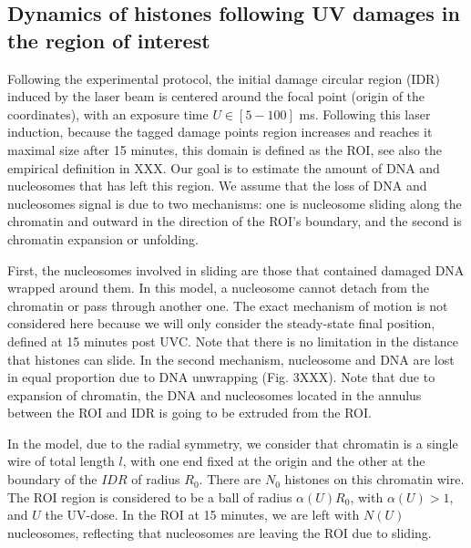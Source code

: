 \documentclass[12pt]{article}
\begin{document}
\subsection{Dynamics of histones following UV damages in the region of interest}
Following the experimental protocol, the initial damage circular region (IDR) induced by the laser beam is centered around the focal point (origin of the coordinates), with an exposure time $U \in [5-100]$ ms. Following this laser induction, because the tagged damage points region increases and reaches it maximal size after 15 minutes, this domain is defined as the ROI, see also the empirical definition in XXX. Our goal is to estimate the amount of DNA and nucleosomes that has left this region. We assume that the loss of DNA and nucleosomes signal is due to two mechanisms: one is nucleosome sliding along the chromatin and outward in the direction of the ROI's boundary, and the second is chromatin expansion or unfolding. 

First, the nucleosomes involved in sliding are those that contained damaged DNA wrapped around them. In this model, a nucleosome cannot detach from the chromatin or pass through another one. The exact mechanism of motion is not considered here because we will only consider the steady-state final position, defined at 15 minutes post UVC. Note that there is no limitation in the distance that histones can slide.  In the second mechanism, nucleosome and DNA are lost in equal proportion due to DNA unwrapping (Fig. 3XXX). Note that due to expansion of chromatin, the DNA and nucleosomes located in the annulus between the ROI and IDR is going to be extruded from the ROI.

In the model, due to the radial symmetry, we consider that chromatin is a single wire of total length $l$, with one end fixed at the origin and the other at the boundary of the $IDR$ of radius $R_0$. There are $N_0$ histones on this chromatin wire.  The ROI region is considered to be a ball of radius $\alpha(U) R_0$, with  $\alpha(U)> 1$, and $U$ the UV-dose. In the ROI at 15 minutes, we are left with $N(U)$ nucleosomes, reflecting that nucleosomes are leaving the ROI due to sliding.
\end{document}
